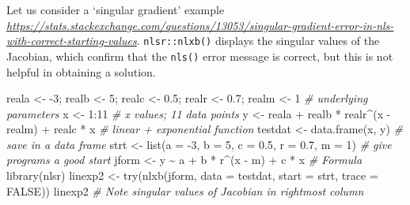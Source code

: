 \documentclass[
]{article}
\newenvironment{Shaded}{\begin{snugshade}}{\end{snugshade}}
\newcommand{\AttributeTok}[1]{\textcolor[rgb]{0.77,0.63,0.00}{#1}}
\newcommand{\CommentTok}[1]{\textcolor[rgb]{0.56,0.35,0.01}{\textit{#1}}}
\newcommand{\ConstantTok}[1]{\textcolor[rgb]{0.00,0.00,0.00}{#1}}
\newcommand{\DecValTok}[1]{\textcolor[rgb]{0.00,0.00,0.81}{#1}}
\newcommand{\FloatTok}[1]{\textcolor[rgb]{0.00,0.00,0.81}{#1}}
\newcommand{\FunctionTok}[1]{\textcolor[rgb]{0.00,0.00,0.00}{#1}}
\newcommand{\NormalTok}[1]{#1}
\newcommand{\OtherTok}[1]{\textcolor[rgb]{0.56,0.35,0.01}{#1}}
\newcommand{\SpecialCharTok}[1]{\textcolor[rgb]{0.00,0.00,0.00}{#1}}
\begin{document}
Let us consider a `singular gradient' example
\emph{\url{https://stats.stackexchange.com/questions/13053/singular-gradient-error-in-nls-with-correct-starting-values}}.
\texttt{nlsr::nlxb()} displays the singular values of the Jacobian,
which confirm that the \texttt{nls()} error message is correct, but this
is not helpful in obtaining a solution.

\begin{Shaded}
\begin{Highlighting}[]
\NormalTok{reala }\OtherTok{\textless{}{-}} \SpecialCharTok{{-}}\DecValTok{3}\NormalTok{; realb }\OtherTok{\textless{}{-}} \DecValTok{5}\NormalTok{; realc }\OtherTok{\textless{}{-}} \FloatTok{0.5}\NormalTok{; realr }\OtherTok{\textless{}{-}} \FloatTok{0.7}\NormalTok{; realm }\OtherTok{\textless{}{-}} \DecValTok{1} \CommentTok{\# underlying parameters}
\NormalTok{x }\OtherTok{\textless{}{-}} \DecValTok{1}\SpecialCharTok{:}\DecValTok{11} \CommentTok{\# x values; 11 data points}
\NormalTok{y }\OtherTok{\textless{}{-}}\NormalTok{ reala }\SpecialCharTok{+}\NormalTok{ realb }\SpecialCharTok{*}\NormalTok{ realr}\SpecialCharTok{\^{}}\NormalTok{(x }\SpecialCharTok{{-}}\NormalTok{ realm) }\SpecialCharTok{+}\NormalTok{ realc }\SpecialCharTok{*}\NormalTok{ x }\CommentTok{\# linear + exponential function}
\NormalTok{testdat }\OtherTok{\textless{}{-}} \FunctionTok{data.frame}\NormalTok{(x, y) }\CommentTok{\# save in a data frame}
\NormalTok{strt }\OtherTok{\textless{}{-}} \FunctionTok{list}\NormalTok{(}\AttributeTok{a =} \SpecialCharTok{{-}}\DecValTok{3}\NormalTok{, }\AttributeTok{b =} \DecValTok{5}\NormalTok{, }\AttributeTok{c =} \FloatTok{0.5}\NormalTok{, }\AttributeTok{r =} \FloatTok{0.7}\NormalTok{, }\AttributeTok{m =} \DecValTok{1}\NormalTok{) }\CommentTok{\# give programs a good start}
\NormalTok{jform }\OtherTok{\textless{}{-}}\NormalTok{ y }\SpecialCharTok{\textasciitilde{}}\NormalTok{ a }\SpecialCharTok{+}\NormalTok{ b }\SpecialCharTok{*}\NormalTok{ r}\SpecialCharTok{\^{}}\NormalTok{(x }\SpecialCharTok{{-}}\NormalTok{ m) }\SpecialCharTok{+}\NormalTok{ c }\SpecialCharTok{*}\NormalTok{ x }\CommentTok{\# Formula}
\FunctionTok{library}\NormalTok{(nlsr)}
\NormalTok{linexp2 }\OtherTok{\textless{}{-}} \FunctionTok{try}\NormalTok{(}\FunctionTok{nlxb}\NormalTok{(jform, }\AttributeTok{data =}\NormalTok{ testdat, }\AttributeTok{start =}\NormalTok{ strt, }\AttributeTok{trace =} \ConstantTok{FALSE}\NormalTok{))}
\NormalTok{linexp2 }\CommentTok{\# Note singular values of Jacobian in rightmost column}
\end{Highlighting}
\end{Shaded}
\end{document}
